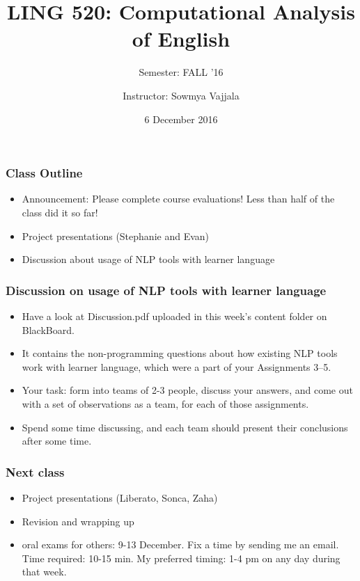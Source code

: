 \documentclass{beamer}
\author[Sowmya Vajjala]{Instructor: Sowmya Vajjala}
\title[LING 520]{LING 520: Computational Analysis of English}
\subtitle{Semester: FALL '16}
\date{6 December 2016}
\institute{Iowa State University, USA}
\begin{document}
\begin{frame}\titlepage
\end{frame}

\begin{frame}
\frametitle{Class Outline}
\begin{itemize}
\item Announcement: Please complete course evaluations! Less than half of the class did it so far! 
\item Project presentations (Stephanie and Evan)
\item Discussion about usage of NLP tools with learner language  %
\end{itemize}
\end{frame}

\begin{frame}
\frametitle{Discussion on usage of NLP tools with learner language }
\begin{itemize}
\item Have a look at Discussion.pdf uploaded in this week's content folder on BlackBoard. 
\item It contains the non-programming questions about how existing NLP tools work with learner language, which were a part of your Assignments 3--5.
\item Your task: form into teams of 2-3 people, discuss your answers, and come out with a set of observations as a team, for each of those assignments. 
\item Spend some time discussing, and each team should present their conclusions after some time.
\end{itemize}
\end{frame}

\begin{frame} %
\frametitle{Next class}
\begin{itemize}
\item Project presentations (Liberato, Sonca, Zaha)
\item Revision and wrapping up
\item oral exams for others: 9-13 December. Fix a time by sending me an email. Time required: 10-15 min. My preferred timing: 1-4 pm on any day during that week. 
\end{itemize}
\end{frame}
\end{document}
